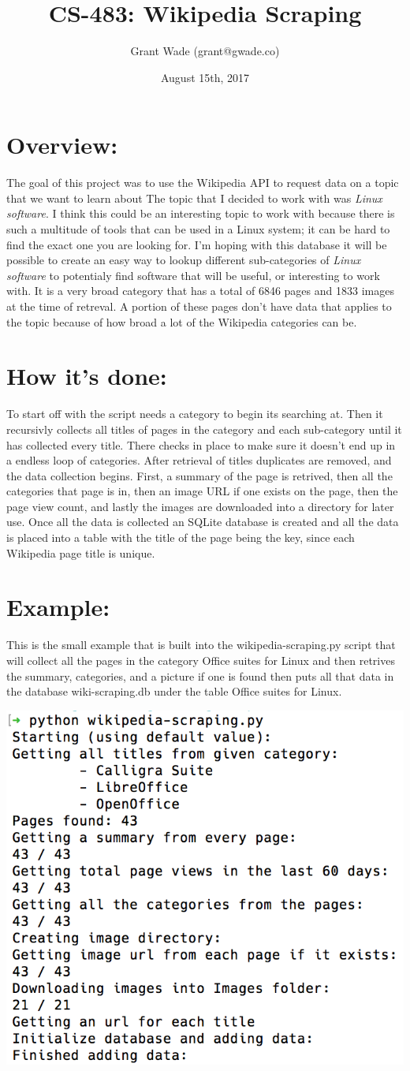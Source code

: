 \documentclass{article}
\title{\textbf{CS-483: Wikipedia Scraping}}
\author{Grant Wade (grant@gwade.co)}
\date{August 15th, 2017}
\begin{document}
\maketitle

\section*{Overview:}
The goal of this project was to use the Wikipedia API to request data on
a topic that we want to learn about The topic that I decided to work with
was \textit{Linux software}. I think this could be an interesting topic to
work with because there is such a multitude of tools that can be used in a
Linux system; it can be hard to find the exact one you are looking for.
I'm hoping with this database it will be possible to create an easy way to
lookup different sub-categories of \textit{Linux software} to potentialy 
find software that will be useful, or interesting to work with. It is a very
broad category that has a total of 6846 pages and 1833 images at the time
of retreval. A portion of these pages don't have data that applies to the
topic because of how broad a lot of the Wikipedia categories can be.

\section*{How it's done:}
To start off with the script needs a category to begin its searching at.
Then it recursivly collects all titles of pages in the category and each
sub-category until it has collected every title. There checks in place to
make sure it doesn't end up in a endless loop of categories. After retrieval
of titles duplicates are removed, and the data collection begins. First, a
summary of the page is retrived, then all the categories that page is in,
then an image URL if one exists on the page, then the page view count, 
and lastly the images are downloaded into a directory for later use. 
Once all the data is collected an SQLite database is created and all the
data is placed into a table with the title of the page being the key,
since each Wikipedia page title is unique.

\section*{Example:}
This is the small example that is built into the wikipedia-scraping.py
script that will collect all the pages in the category Office suites for Linux
and then retrives the summary, categories, and a picture if one is found
then puts all that data in the database wiki-scraping.db under the table
Office suites for Linux.

\begin{center}
\includegraphics[width=.4\textwidth]{example.png}
\end{center}
\end{document}
